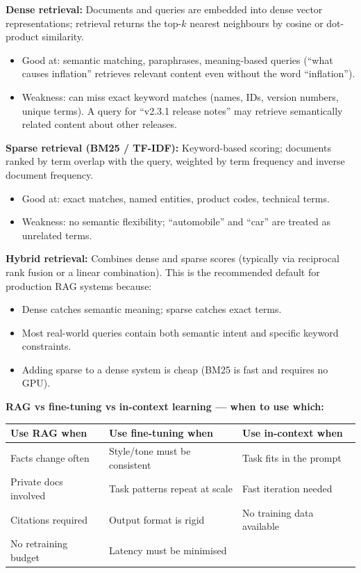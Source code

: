\textbf{Dense retrieval:}
Documents and queries are embedded into dense vector representations; retrieval
returns the top-$k$ nearest neighbours by cosine or dot-product similarity.
\begin{itemize}
  \item Good at: semantic matching, paraphrases, meaning-based queries
    (``what causes inflation'' retrieves relevant content even without the word
    ``inflation'').
  \item Weakness: can miss exact keyword matches (names, IDs, version numbers,
    unique terms). A query for ``v2.3.1 release notes'' may retrieve semantically
    related content about other releases.
\end{itemize}

\textbf{Sparse retrieval (BM25 / TF-IDF):}
Keyword-based scoring; documents ranked by term overlap with the query, weighted by
term frequency and inverse document frequency.
\begin{itemize}
  \item Good at: exact matches, named entities, product codes, technical terms.
  \item Weakness: no semantic flexibility; ``automobile'' and ``car'' are treated
    as unrelated terms.
\end{itemize}

\textbf{Hybrid retrieval:}
Combines dense and sparse scores (typically via reciprocal rank fusion or a linear
combination). This is the recommended default for production RAG systems because:
\begin{itemize}
  \item Dense catches semantic meaning; sparse catches exact terms.
  \item Most real-world queries contain both semantic intent and specific
    keyword constraints.
  \item Adding sparse to a dense system is cheap (BM25 is fast and requires no GPU).
\end{itemize}

\textbf{RAG vs fine-tuning vs in-context learning --- when to use which:}
\begin{center}
\begin{tabular}{lll}
\toprule
\textbf{Use RAG when} & \textbf{Use fine-tuning when} & \textbf{Use in-context when} \\
\midrule
Facts change often & Style/tone must be consistent & Task fits in the prompt \\
Private docs involved & Task patterns repeat at scale & Fast iteration needed \\
Citations required & Output format is rigid & No training data available \\
No retraining budget & Latency must be minimised & \\
\bottomrule
\end{tabular}
\end{center}

